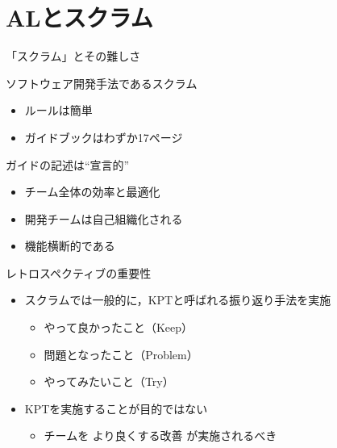 \documentclass[uplatex,dvipdfmx,14pt,presentation,t]{beamer}
\begin{document}
\section{ALとスクラム}
\label{sec-2}
\begin{frame}[label=sec-2-1]{「スクラム」とその難しさ}
\begin{block}{ソフトウェア開発手法であるスクラム}
\begin{itemize}
\item ルールは簡単
\item ガイドブックはわずか17ページ
\end{itemize}
\pause
\end{block}
\begin{block}{ガイドの記述は“宣言的”}
\begin{itemize}
\item チーム全体の効率と最適化
\item 開発チームは自己組織化される
\item 機能横断的である
\end{itemize}
\end{block}
\end{frame}

\begin{frame}[label=sec-2-2]{レトロスペクティブの重要性}
\begin{itemize}
\item スクラムでは一般的に，KPTと呼ばれる振り返り手法を実施
\begin{itemize}
\item やって良かったこと（Keep）
\item 問題となったこと（Problem）
\item やってみたいこと（Try）
\end{itemize}
\end{itemize}
\pause
\begin{itemize}
\item KPTを実施することが目的ではない
\begin{itemize}
\item チームを \alert{より良くする改善} が実施されるべき
\end{itemize}
\end{itemize}
\end{frame}
\end{document}
